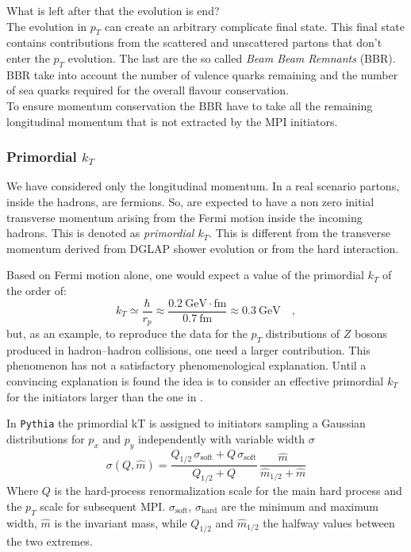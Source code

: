 What is left after that the evolution is end?
\\
The evolution in $p_T$ can create an arbitrary complicate final state. 
This final state contains contributions from the scattered and unscattered partons that don't enter the $p_T$ evolution. The last are the so called \textit{Beam Beam Remnants} (BBR). 
BBR take into account the number of valence quarks remaining and the number of sea quarks required for the overall flavour conservation.
\\
To ensure momentum conservation the BBR have to take all the remaining longitudinal momentum that is not extracted by the MPI initiators.

\subsubsection*{Primordial $k_T$}

We have considered only the longitudinal momentum. In a real scenario partons, inside the hadrons, are fermions. So, are expected to have a non zero initial transverse momentum arising from the Fermi motion inside the incoming hadrons. This is denoted as \textit{primordial $k_T$}. This is different from the transverse momentum derived from DGLAP shower evolution or from the hard interaction.

\bigskip

\noindent Based on Fermi motion alone, one would expect a value of the primordial $k_T$ of the order of: 
\begin{equation}
	k_T\simeq\frac{\hbar}{r_p}\approx\frac{0.2\ \mathrm{GeV\cdot fm}}{0.7\ \mathrm{fm}}\approx0.3\ \mathrm{GeV}\quad,
\label{eq:PrimordialKT}
\end{equation}
but, as an example, to reproduce the data for the $p_T$ distributions of $Z$ bosons produced in hadron–hadron collisions, one need a larger contribution. This phenomenon has not a satisfactory phenomenological explanation. Until a convincing explanation is found the idea is to consider an effective primordial $k_T$ for the initiators larger than the one in .

\medskip

In \texttt{Pythia} the primordial kT is assigned to initiators sampling a Gaussian distributions for $p_x$ and $p_y$ independently with variable width $\sigma$
\begin{equation}
	\sigma(Q,\widehat{m})=\frac{Q_{1/2}\,\sigma_{\text{soft}}+Q\,\sigma_{\text{soft}}}{Q_{1/2}+Q}\,\frac{\widehat{m}}{\widehat{m}_{1/2}+\widehat{m}}
\end{equation}
Where $Q$ is the hard-process renormalization scale for the main hard process and the $p_T$ scale for subsequent MPI. $\sigma_{\text{soft}}$, $\sigma_{\text{hard}}$ are the minimum and maximum width, $\widehat{m}$ is the invariant mass, while $Q_{1/2}$ and $\widehat{m}_{1/2}$ the halfway values between the two extremes.

